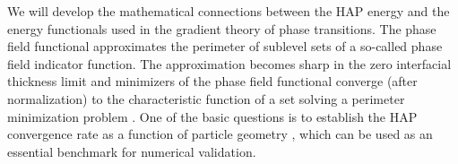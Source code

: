 We will develop the mathematical connections between the HAP energy and the energy functionals used in the gradient theory of phase transitions. 
The phase field functional approximates the perimeter of sublevel sets of a so-called phase field indicator function. 
The approximation becomes sharp in the zero interfacial thickness limit and minimizers of the phase field functional converge (after normalization) 
to the characteristic function of a set solving a perimeter minimization problem 
\cite{Modica87, MODICA1987487, LuMo89}. 
%
%
One of the basic questions is to establish the HAP convergence rate as a function of particle geometry 
\cite{LuMo89}, which can be used as an essential benchmark for numerical validation. 
%
%
